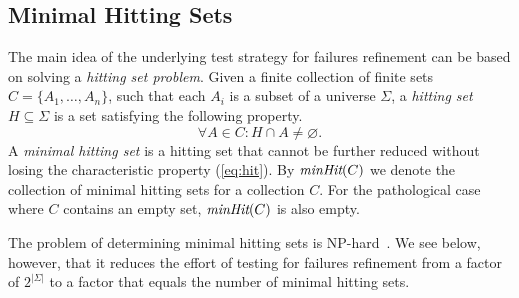 \subsection{Minimal Hitting Sets}
\label{sec:hit}

The main idea of the underlying test strategy for failures refinement can be
based on solving a \emph{hitting set problem}. Given a finite collection of
finite sets $C = \{ A_1,\dots,A_n\}$, such that each $A_i$ is a subset of a
universe $\Sigma$, a \emph{hitting set} $H\subseteq\Sigma$ is a set
satisfying the following property.
%
\begin{equation}
  \label{eq:hit}
  \forall A\in C: H\cap A \neq\varnothing.
\end{equation}
%
A \emph{minimal hitting set} is a hitting set that cannot be further reduced
without losing the characteristic property (\ref{eq:hit}). By $\text{\it minHit}(C)$
we denote the collection of minimal hitting sets for a collection $C$. For
the pathological case where $C$ contains an empty set, $\text{\it minHit}(C)$ is also
empty.

The problem of determining minimal hitting sets is %
NP-hard~\cite{5533149}. We see below, however, that it reduces the effort of
testing for failures refinement from a factor of $2^{|\Sigma|}$ to a factor
that equals the number of minimal hitting sets.

